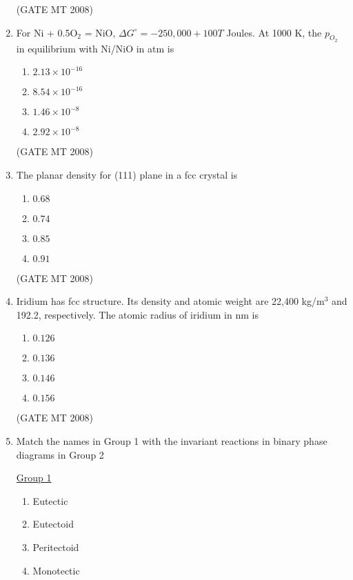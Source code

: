 \documentclass[journal, 11pt, onecolumn]{IEEEtran}
\theoremstyle{remark}
\begin{document}
\begin{enumerate}
\hfill(GATE MT 2008) 
\item For Ni + 0.5O$_2$ = NiO, $\Delta G^\circ = -250,000 + 100T$ Joules. At 1000 K, the $p_{O_2}$ in equilibrium with Ni/NiO in atm is 

\begin{multicols}{4}
\begin{enumerate}
\item $2.13 \times 10^{-16}$
\item $8.54 \times 10^{-16}$
\item $1.46 \times 10^{-8}$
\item $2.92 \times 10^{-8}$
\end{enumerate}
\end{multicols}

\hfill(GATE MT 2008) 
\item The planar density for (111) plane in a fcc crystal is 

\begin{multicols}{4}
\begin{enumerate}
\item $0.68$
\item $0.74$ 
\item $0.85$ 
\item $0.91$
\end{enumerate}
\end{multicols}

\hfill(GATE MT 2008)

\item Iridium has fcc structure. Its density and atomic weight are 22,400 kg/m$^3$ and 192.2, respectively. The atomic radius of iridium in nm is

\begin{multicols}{4}
\begin{enumerate}
\item $0.126$ 
\item $0.136$ 
\item $0.146$ 
\item $0.156$
\end{enumerate}
\end{multicols}

\hfill(GATE MT 2008) 

\item Match the names in Group 1 with the invariant reactions in binary phase diagrams in Group 2
\begin{multicols}{2}
\underline{Group 1}
\begin{enumerate}
\item Eutectic
\item Eutectoid 
\item Peritectoid
\item Monotectic
\end{enumerate}


\end{multicols}
\end{enumerate}
\end{document}
